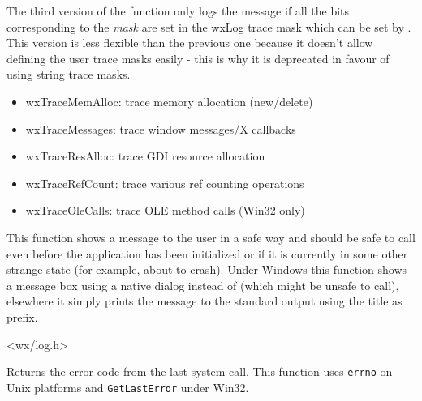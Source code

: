 The third version of the function only logs the message if all the bits
corresponding to the {\it mask} are set in the wxLog trace mask which can be
set by . This version is less
flexible than the previous one because it doesn't allow defining the user
trace masks easily - this is why it is deprecated in favour of using string
trace masks.

\begin{itemize}\itemsep=0pt
\item wxTraceMemAlloc: trace memory allocation (new/delete)
\item wxTraceMessages: trace window messages/X callbacks
\item wxTraceResAlloc: trace GDI resource allocation
\item wxTraceRefCount: trace various ref counting operations
\item wxTraceOleCalls: trace OLE method calls (Win32 only)
\end{itemize}


\label{wxsafeshowmessage}


This function shows a message to the user in a safe way and should be safe to
call even before the application has been initialized or if it is currently in
some other strange state (for example, about to crash). Under Windows this
function shows a message box using a native dialog instead of
 (which might be unsafe to call), elsewhere
it simply prints the message to the standard output using the title as prefix.







<wx/log.h>


\label{wxsyserrorcode}


Returns the error code from the last system call. This function uses
{\tt errno} on Unix platforms and {\tt GetLastError} under Win32.

